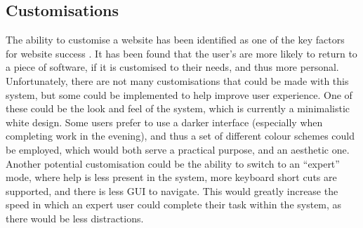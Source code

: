 \subsection{Customisations}
The ability to customise a website has been identified as one of the key factors for website success \cite{fan2010factors}. It has been found that the user's are more likely to return to a piece of software, if it is customised to their needs, and thus more personal. Unfortunately, there are not many customisations that could be made with this system, but some could be implemented to help improve user experience. One of these could be the look and feel of the system, which is currently a minimalistic white design. Some users prefer to use a darker interface (especially when completing work in the evening), and thus a set of different colour schemes could be employed, which would both serve a practical purpose, and an aesthetic one. Another potential customisation could be the ability to switch to an ``expert'' mode, where help is less present in the system, more keyboard short cuts are supported, and there is less GUI to navigate. This would greatly increase the speed in which an expert user could complete their task within the system, as there would be less distractions.